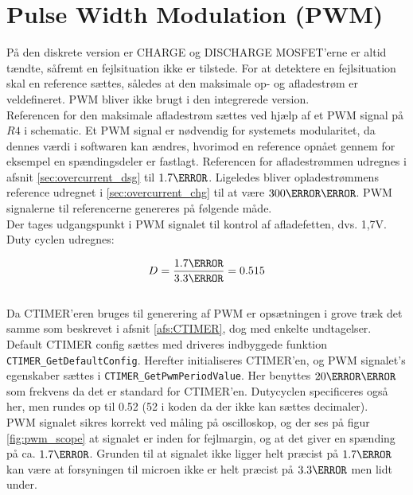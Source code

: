 \section{Pulse Width Modulation (PWM)}\label{afs:PWM}
På den diskrete version er CHARGE og DISCHARGE MOSFET'erne er altid tændte, såfremt en fejlsituation ikke er tilstede. For at detektere en fejlsituation skal en reference sættes, således at den maksimale op- og afladestrøm er veldefineret. PWM bliver ikke brugt i den integrerede version. \\

Referencen for den maksimale afladestrøm sættes ved hjælp af et PWM signal på $R4$ i schematic. Et PWM signal er nødvendig for systemets modularitet, da dennes værdi i softwaren kan ændres, hvorimod en reference opnået gennem for eksempel en spændingsdeler er fastlagt. Referencen for afladestrømmen udregnes i afsnit \ref{sec:overcurrent_dsg} til $1.7\volt$. Ligeledes bliver opladestrømmens reference udregnet i \ref{sec:overcurrent_chg} til at være $300\milli\volt$. PWM signalerne til referencerne genereres på følgende måde. \\

Der tages udgangspunkt i PWM signalet til kontrol af afladefetten, dvs. 1,7V. Duty cyclen udregnes: 

\begin {equation}
D = \frac{1.7\volt}{3.3\volt} = 0.515
\label{eq:duty}
\end {equation}\\

Da CTIMER'eren bruges til generering af PWM er opsætningen i grove træk det samme som beskrevet i afsnit \ref{afs:CTIMER}, dog med enkelte undtagelser. Default CTIMER config sættes med driveres indbyggede funktion \verb|CTIMER_GetDefaultConfig|. Herefter initialiseres CTIMER'en, og PWM signalet's egenskaber sættes i \verb|CTIMER_GetPwmPeriodValue|. Her benyttes $20\kilo\hertz$ som frekvens da det er standard for CTIMER'en. Dutycyclen specificeres også her, men rundes op til 0.52 (52 i koden da der ikke kan sættes decimaler).\\ 

PWM signalet sikres korrekt ved måling på oscilloskop, og der ses på figur \ref{fig:pwm_scope} at signalet er inden for fejlmargin, og at det giver en spænding på ca. $1.7\volt$. Grunden til at signalet ikke ligger helt præcist på $1.7\volt$ kan være at forsyningen til microen ikke er helt præcist på $3.3\volt$ men lidt under. \\

